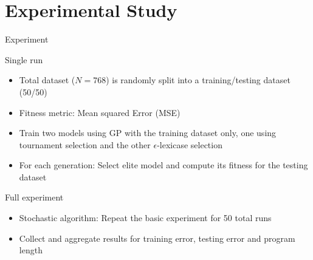 \documentclass[
  ignorenonframetext,
]{beamer}
\providecommand{\tightlist}{%
  \setlength{\itemsep}{0pt}\setlength{\parskip}{0pt}}
\begin{document}
\hypertarget{experimental-study}{%
\section{Experimental Study}\label{experimental-study}}


\begin{frame}{Experiment}
\protect\hypertarget{experiment}{}
\begin{block}{Single run}
\protect\hypertarget{single-run}{}
\begin{itemize}
\tightlist
\item
  Total dataset (\(N=768\)) is randomly split into a training/testing
  dataset (50/50)
\item
  Fitness metric: Mean squared Error (MSE)
\item
  Train two models using GP with the training dataset only, one using
  tournament selection and the other \(\epsilon\)-lexicase selection
\item
  For each generation: Select elite model and compute its fitness for
  the testing dataset
\end{itemize}
\end{block}

\begin{block}{Full experiment}
\protect\hypertarget{full-experiment}{}
\begin{itemize}
\tightlist
\item
  Stochastic algorithm: Repeat the basic experiment for 50 total runs
\item
  Collect and aggregate results for training error, testing error and
  program length
\end{itemize}
\end{block}
\end{frame}
\end{document}
